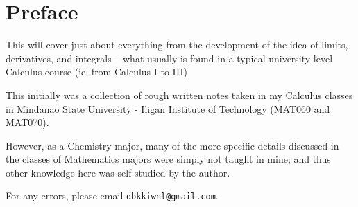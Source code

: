 \chapter*{Preface}
This will cover just about everything from the development of the idea of limits, derivatives, and integrals -- what usually is found in a typical university-level Calculus course (ie. from Calculus I to III)

This initially was a collection of rough written notes taken in my Calculus classes in Mindanao State University - Iligan Institute of Technology (MAT060 and MAT070).

However, as a Chemistry major, many of the more specific details discussed in the classes of Mathematics majors were simply not taught in mine; and thus other knowledge here was self-studied by the author.

For any errors, please email \texttt{dbkkiwnl@gmail.com}.